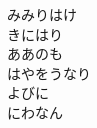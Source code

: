 \documentclass[10pt,b5j]{tarticle} %
\begin{document}
\begin{enumerate}
\begin{minipage}[c]{\blocksize}
        \vspace{\linespace}
        \item
		みみりはけ\\
		きにはり\\
		ああのも\\
		はやをうなり\\
		よびに\\
		にわなん\\
    
    \end{minipage}
\end{enumerate} %
\end{document}
